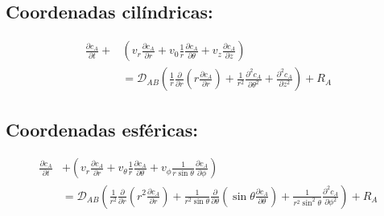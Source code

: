 \subsection*{Coordenadas cilíndricas:}
\begin{equation} 
    \begin{split} 
    \frac{\partial c_A}{\partial t} + &\left( v_r \frac{\partial c_A}{\partial r} + v_0 \frac{1}{r} \frac{\partial c_A}{\partial \theta} + v_z \frac{\partial c_A}{\partial z} \right) \\
      &= \mathcal{D}_{AB} \left( \frac{1}{r} \frac{\partial}{\partial r} \left( r \frac{\partial c_A}{\partial r} \right) + \frac{1}{r^2} \frac{\partial^2 c_A}{\partial \theta^2} + \frac{\partial^2 c_A}{\partial z^2} \right) + R_A
    \end{split} 
    \tag{B}
\end{equation}

\subsection*{Coordenadas esféricas:}
\begin{equation}
    \begin{split}
        \frac{\partial c_A}{\partial t} &+ \left( v_r \frac{\partial c_A}{\partial r} + v_{\theta} \frac{1}{r} \frac{\partial c_A}{\partial \theta} + v_\phi \frac{1}{r \sin \theta} \frac{\partial c_A}{\partial \phi} \right) \\
        &= \mathcal{D}_{AB} \left( \frac{1}{r^2} \frac{\partial}{\partial r} \left( r^2 \frac{\partial c_A}{\partial r} \right) + \frac{1}{r^2 \sin \theta} \frac{\partial}{\partial \theta} \left( \sin \theta \frac{\partial c_A}{\partial \theta} \right) + \frac{1}{r^2 \sin^2 \theta} \frac{\partial^2 c_A}{\partial \phi^2} \right) + R_A 
    \end{split}
    \tag{C}
\end{equation}

\newpage


